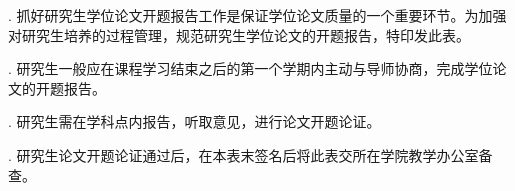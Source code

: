 {%
\newpage
\thispagestyle{empty}
\begin{center}
 \heiti{}
\end{center}
\vspace*{40pt}
   {\kaishu{}

   .	抓好研究生学位论文开题报告工作是保证学位论文质量的一个重要环节。为加强对研究生培养的过程管理，规范研究生学位论文的开题报告，特印发此表。
   
   \vspace*{20pt}
   
   .	研究生一般应在课程学习结束之后的第一个学期内主动与导师协商，完成学位论文的开题报告。
   
   \vspace*{20pt}
   
   .	研究生需在学科点内报告，听取意见，进行论文开题论证。
   
   \vspace*{20pt}
   
   .	研究生论文开题论证通过后，在本表末签名后将此表交所在学院教学办公室备查。

   }
	\renewcommand{\arraystretch}{1}
    \clearpage
}
\fi

